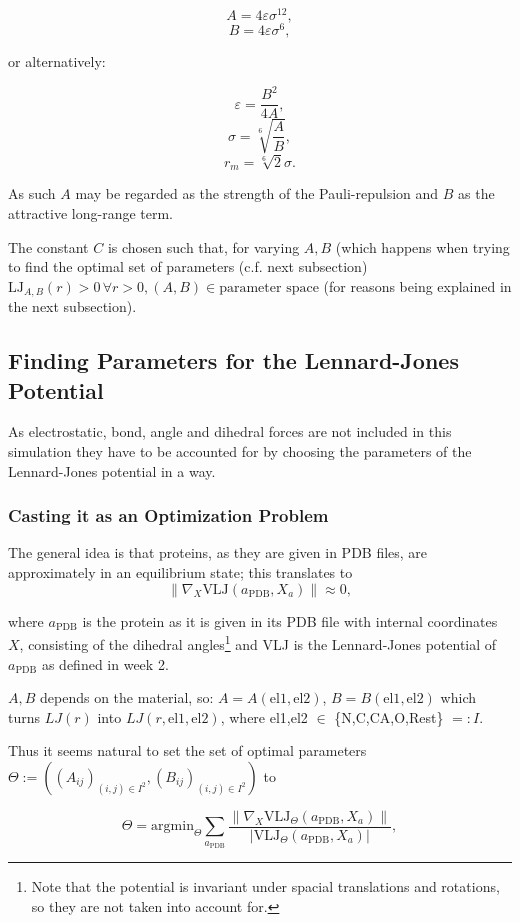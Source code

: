 $$A = 4\varepsilon\sigma^{12},$$
$$B = 4\varepsilon\sigma^6,$$

or alternatively:

$$\varepsilon = \frac{B^2}{4A},$$
$$\sigma = \sqrt[6]{\frac{A}{B}},$$
$$r_m = \sqrt[6]{2}\sigma.$$

As such $A$ may be regarded as the strength of the Pauli-repulsion and $B$ as the attractive long-range term.

The constant $C$ is chosen such that, for varying $A,B$ (which happens when trying to find the optimal set of parameters (c.f. next subsection) $\text{LJ}_{A,B}(r) > 0\, \forall r>0,(A,B)\in \text{parameter space}$ (for reasons being explained in the next subsection).

\subsection{Finding Parameters for the Lennard-Jones Potential}
As electrostatic, bond, angle and dihedral forces are not included in this simulation they have to be accounted for by choosing the parameters of the Lennard-Jones potential in a way.

\subsubsection{Casting it as an Optimization Problem}
The general idea is that proteins, as they are given in PDB files, are approximately in an equilibrium state; this translates to $$\|\nabla_X \text{VLJ}(a_\text{PDB},X_a)\| \approx 0,$$

where $a_\text{PDB}$ is the protein as it is given in its PDB file with internal coordinates $X$, consisting of the dihedral angles\footnote{Note that the potential is invariant under spacial translations and rotations, so they are not taken into account for.} and VLJ is the Lennard-Jones potential of $a_\text{PDB}$ as defined in week 2.

$A,B$ depends on the material, so: $A = A(\text{el1},\text{el2})$, $B = B(\text{el1},\text{el2})$ which turns $LJ(r)$ into $LJ(r,\text{el1},\text{el2})$, where el1,el2 $\in$ \{N,C,CA,O,Rest\} $=: I$.

Thus it seems natural to set the set of optimal parameters $\Theta := ((A_{ij})_{(i,j)\in I^2},(B_{ij})_{(i,j)\in I^2})$ to

$$\Theta = \text{argmin}_\Theta \sum_{a_\text{PDB}} \frac{\| \nabla_X \text{VLJ}_\Theta(a_\text{PDB},X_a) \|}{| \text{VLJ}_\Theta(a_\text{PDB},X_a) |},$$

